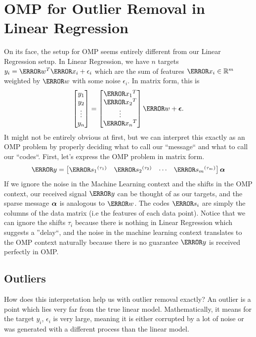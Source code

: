   \section{OMP for Outlier Removal in Linear Regression}
  On its face, the setup for OMP seems entirely different from our Linear Regression setup.
  In Linear Regression, we have $n$ targets $y_i = \V{w}^T\V{x_i}+\epsilon_i$ which are the sum of features $\V{x_i}\in\mathbb{R}^m$ weighted by $\V{w}$ with some noise $\epsilon_i$.
  In matrix form, this is
  \[
	\begin{bmatrix}
	  y_1\\y_2\\\vdots\\y_n
	\end{bmatrix} = \begin{bmatrix}
	  \V{x_1}^T\\\V{x_2}^T\\\vdots\\\V{x_n}^T
	\end{bmatrix}\V{w} + \bs{\epsilon}.
  \]
  It might not be entirely obvious at first, but we can interpret this exactly as an OMP problem by properly deciding what to call our ``message`` and what to call our ``codes``.
  First, let's express the OMP problem in matrix form.
  \[
	\V{y} = \begin{bmatrix}
	  \V{s_1}^{(\tau_1)} & \V{s_2}^{(\tau_2)} & \cdots & \V{s_m}^{(\tau_m)}
	\end{bmatrix}\bs{\alpha}
  \]
  If we ignore the noise in the Machine Learning context and the shifts in the OMP context, our received signal $\V{y}$ can be thought of as our targets, and the sparse message $\boldsymbol{\alpha}$ is analogous to $\V{w}$.
  The codes $\V{s_i}$ are simply the columns of the data matrix (i.e the features of each data point). Notice that we can ignore the shifts $\tau_i$ because there is nothing in Linear Regression which suggests a ''delay``, and the noise in the machine learning context translates to the OMP context naturally because there is no guarantee $\V{y}$ is received perfectly in OMP.
  \subsection{Outliers}
  How does this interpretation help us with outlier removal exactly?
  An outlier is a point which lies very far from the true linear model.
  Mathematically, it means for the target $y_i$, $\epsilon_i$ is very large, meaning it is either corrupted by a lot of noise or was generated with a different process than the linear model.

